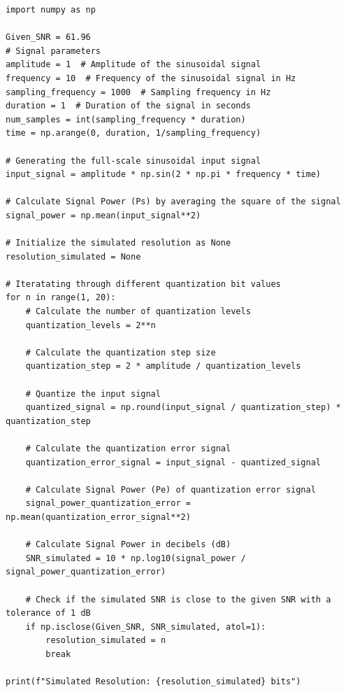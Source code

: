 \documentclass[journal,12pt,onecolumn]{IEEEtran}
\begin{document}
\begin{verbatim}
import numpy as np

Given_SNR = 61.96 
# Signal parameters
amplitude = 1  # Amplitude of the sinusoidal signal
frequency = 10  # Frequency of the sinusoidal signal in Hz
sampling_frequency = 1000  # Sampling frequency in Hz
duration = 1  # Duration of the signal in seconds
num_samples = int(sampling_frequency * duration)
time = np.arange(0, duration, 1/sampling_frequency)

# Generating the full-scale sinusoidal input signal
input_signal = amplitude * np.sin(2 * np.pi * frequency * time)

# Calculate Signal Power (Ps) by averaging the square of the signal
signal_power = np.mean(input_signal**2)

# Initialize the simulated resolution as None
resolution_simulated = None

# Iteratating through different quantization bit values
for n in range(1, 20):
    # Calculate the number of quantization levels
    quantization_levels = 2**n
    
    # Calculate the quantization step size
    quantization_step = 2 * amplitude / quantization_levels
    
    # Quantize the input signal
    quantized_signal = np.round(input_signal / quantization_step) * quantization_step
    
    # Calculate the quantization error signal
    quantization_error_signal = input_signal - quantized_signal
    
    # Calculate Signal Power (Pe) of quantization error signal
    signal_power_quantization_error = np.mean(quantization_error_signal**2)
    
    # Calculate Signal Power in decibels (dB)
    SNR_simulated = 10 * np.log10(signal_power / signal_power_quantization_error)
    
    # Check if the simulated SNR is close to the given SNR with a tolerance of 1 dB
    if np.isclose(Given_SNR, SNR_simulated, atol=1):
        resolution_simulated = n
        break

print(f"Simulated Resolution: {resolution_simulated} bits")
\end{verbatim}
\end{document}
